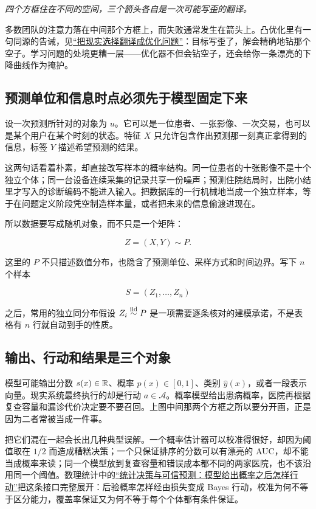 \emph{四个方框住在不同的空间，三个箭头各自是一次可能写歪的翻译。}

多数团队的注意力落在中间那个方框上，而失败通常发生在箭头上。凸优化里有一句同源的告诫，见\hyperref[sec:09-Convex-Optimization/01-Optimization-Foundations/01]{``把现实选择翻译成优化问题''}：目标写歪了，解会精确地钻那个空子。学习问题的处境更糟一层——优化器不但会钻空子，还会给你一条漂亮的下降曲线作为掩护。

\subsection{预测单位和信息时点必须先于模型固定下来}

设一次预测所针对的对象为 \(u\)。它可以是一位患者、一张影像、一次交易，也可以是某个用户在某个时刻的状态。特征 \(X\) 只允许包含作出预测那一刻真正拿得到的信息，标签 \(Y\) 描述希望预测的结果。

这两句话看着朴素，却直接改写样本的概率结构。同一位患者的十张影像不是十个独立个体；同一台设备连续采集的记录共享一份噪声；预测住院结局时，出院小结里才写入的诊断编码不能进入输入。把数据库的一行机械地当成一个独立样本，等于在问题定义阶段凭空制造样本量，或者把未来的信息偷渡进现在。

所以数据要写成随机对象，而不只是一个矩阵：

\[
Z=(X,Y)\sim P .
\]

这里的 \(P\) 不只描述数值分布，也隐含了预测单位、采样方式和时间边界。写下 \(n\) 个样本

\[
S=(Z_1,\ldots,Z_n)
\]

之后，常用的独立同分布假设 \(Z_i\overset{\mathrm{iid}}{\sim}P\) 是一项需要逐条核对的建模承诺，不是表格有 \(n\) 行就自动到手的性质。

\subsection{输出、行动和结果是三个对象}

模型可能输出分数 \(s(x)\in\mathbb{R}\)、概率 \(p(x)\in[0,1]\)、类别 \(\hat y(x)\)，或者一段表示向量。现实系统最终执行的却是行动 \(a\in\mathcal A\)。概率模型给出患病概率，医院再根据复查容量和漏诊代价决定要不要召回。上图中间那两个方框之所以要分开画，正是因为二者常被当成一件事。

把它们混在一起会长出几种典型误解。一个概率估计器可以校准得很好，却因为阈值取在 \(1/2\) 而造成糟糕决策；一个只保证排序的分数可以有漂亮的 AUC，却不能当成概率来读；同一个模型放到复查容量和错误成本都不同的两家医院，也不该沿用同一个阈值。数理统计中的\hyperref[ch:092]{``统计决策与可信预测：模型给出概率之后怎样行动''}把这条接口完整展开：后验概率怎样经由损失变成 Bayes 行动，校准为何不等于区分能力，覆盖率保证又为何不等于每个个体都有条件保证。

